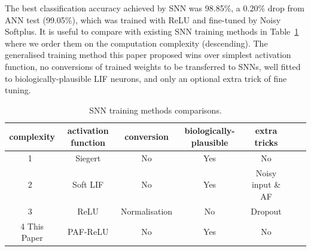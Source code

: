 \documentclass{article}
\begin{document}
The best classification accuracy achieved by SNN was 98.85\%, a 0.20\% drop from ANN test (99.05\%), which was trained with ReLU and fine-tuned by Noisy Softplus.
It is useful to compare with existing SNN training methods in Table~\ref{tbl:compare} where we order them on the computation complexity (descending).
The generalised training method this paper proposed wins over simplest activation function, no conversions of trained weights to be transferred to SNNs, well fitted to biologically-plausible LIF neurons, and only an optional extra trick of fine tuning.
 


\begin{table}[thb]
	\centering
	\caption{\label{tbl:compare}SNN training methods comparisons.}
	\bgroup
	\def\arraystretch{1.4}
	\begin{tabular}{c c c c c c c}
		complexity & activation function & conversion & biologically-plausible  & extra tricks \\
		\hline
	 	1~\cite{Jug_etal_2012} & Siegert & No & Yes & No \\
	 	2~\cite{hunsberger2015spiking} & Soft LIF & No & Yes & Noisy input \& AF\\
	 	3~\cite{diehl2015fast} & ReLU & Normalisation & No & Dropout \\
	 	4 This Paper & PAF-ReLU & No & Yes & No 
	\end{tabular}
	\egroup
\end{table}

\end{document}
